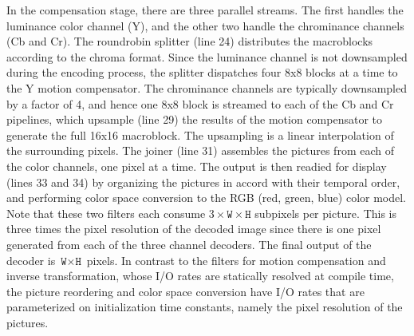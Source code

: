 In the compensation stage, there are three parallel streams.  The
first handles the luminance color channel (Y), and the other two
handle the chrominance channels (Cb and Cr). The roundrobin splitter
(line 24) distributes the macroblocks according to the chroma
format. Since the luminance channel is not downsampled during the
encoding process, the splitter dispatches four 8x8 blocks at a time to
the Y motion compensator. The chrominance channels are typically
downsampled by a factor of 4, and hence one 8x8 block is streamed to
each of the Cb and Cr pipelines, which upsample (line 29) the results
of the motion compensator to generate the full 16x16 macroblock.  The
upsampling is a linear interpolation of the surrounding pixels.
The joiner (line 31) assembles the pictures from each of the color
channels, one pixel at a time.  The output is then readied for display
(lines 33 and 34) by organizing the pictures in accord with their
temporal order, and performing color space conversion to the RGB (red,
green, blue) color model. Note that these two filters each consume
$3\times\texttt{W}\times\texttt{H}$ subpixels per picture. This is
three times the pixel resolution of the decoded image since there is
one pixel generated from each of the three channel decoders. The final
output of the decoder is $\texttt{W}\times\texttt{H}$ pixels.  In
contrast to the filters for motion compensation and inverse transformation,
whose I/O rates are statically resolved at compile time, the picture 
reordering and color space conversion have I/O rates that are
parameterized on initialization time constants, namely the pixel
resolution of the pictures.


